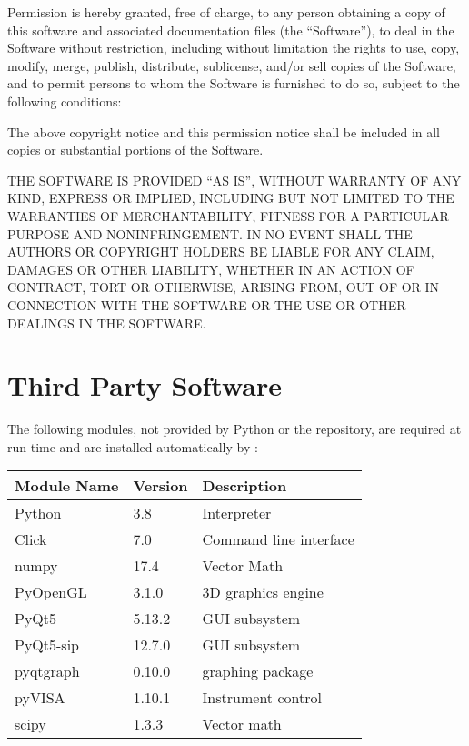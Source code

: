 \documentclass[letterpaper,10pt,english]{sphinxmanual}
\begin{document}
Permission is hereby granted, free of charge, to any person obtaining a copy
of this software and associated documentation files (the “Software”), to deal
in the Software without restriction, including without limitation the rights
to use, copy, modify, merge, publish, distribute, sublicense, and/or sell
copies of the Software, and to permit persons to whom the Software is
furnished to do so, subject to the following conditions:

The above copyright notice and this permission notice shall be included in all
copies or substantial portions of the Software.

THE SOFTWARE IS PROVIDED “AS IS”, WITHOUT WARRANTY OF ANY KIND, EXPRESS OR
IMPLIED, INCLUDING BUT NOT LIMITED TO THE WARRANTIES OF MERCHANTABILITY,
FITNESS FOR A PARTICULAR PURPOSE AND NONINFRINGEMENT. IN NO EVENT SHALL THE
AUTHORS OR COPYRIGHT HOLDERS BE LIABLE FOR ANY CLAIM, DAMAGES OR OTHER
LIABILITY, WHETHER IN AN ACTION OF CONTRACT, TORT OR OTHERWISE, ARISING FROM,
OUT OF OR IN CONNECTION WITH THE SOFTWARE OR THE USE OR OTHER DEALINGS IN THE
SOFTWARE.


\chapter{Third Party Software}
\label{\detokenize{index:third-party-software}}
The following modules, not provided by Python or the 
repository, are required at run time and are installed automatically
by :


\begin{savenotes}\sphinxattablestart
\centering
\begin{tabulary}{\linewidth}[t]{|T|T|T|}
\hline

Module Name
&
Version
&
Description
\\
\hline
Python
&
3.8
&
Interpreter
\\
\hline
Click
&
7.0
&
Command line interface
\\
\hline
numpy
&
17.4
&
Vector Math
\\
\hline
PyOpenGL
&
3.1.0
&
3D graphics engine
\\
\hline
PyQt5
&
5.13.2
&
GUI subsystem
\\
\hline
PyQt5-sip
&
12.7.0
&
GUI subsystem
\\
\hline
pyqtgraph
&
0.10.0
&
graphing package
\\
\hline
pyVISA
&
1.10.1
&
Instrument control
\\
\hline
scipy
&
1.3.3
&
Vector math
\\
\hline
\end{tabulary}
\par
\sphinxattableend\end{savenotes}
\end{document}
